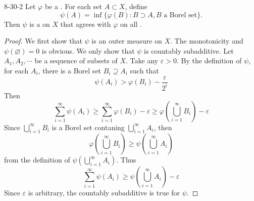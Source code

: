 \documentclass[../main.tex]{subfiles}
\begin{document}
\begin{theorem}{}{8-30-2}
Let $\varphi$ be a . For each set $A \subset X$, define
\[
\psi(A) = \inf\{\varphi(B) : B \supset A, B \text{ a Borel set}\}.
\]
Then $\psi$ is a  on $X$ that agrees with $\varphi$ on all .
\end{theorem}
\begin{proof}
    We first show that \(  \psi   \) is an outer measure on \(  X  \). The monotonicity and \(  \psi \left( \varnothing \right)= 0   \) is obvious. We only show that \(  \psi   \) is countably subadditive. Let \(  A_1,A_2,\cdots   \) be a sequence of subsets of \(  X  \). Take any \(   \varepsilon > 0  \).  By the definition of \(  \psi   \), for each \(  A_{i}  \), there is a Borel set \(  B_{i} \supseteq A_{i} \) such that \[
    \psi \left( A_{i} \right) >  \varphi \left( B_{i} \right)-\frac{ \varepsilon  }{2^{i} }  
    \]  Then \[
    \sum _{i= 1}^{\infty}\psi \left( A_{i} \right)\ge \sum _{i= 1}^{\infty} \varphi \left( B_{i} \right)- \varepsilon \ge    \varphi \left( \bigcup _{i= 1}^{\infty}B_{i} \right)- \varepsilon  
    \]Since \(  \bigcup _{i= 1}^{\infty}B_{i}  \) is a Borel set contaning \(  \bigcup _{i= 1}^{\infty}A_{i}  \), then  \[
     \varphi \left( \bigcup _{i= 1}^{\infty}B_{i} \right)\ge \psi \left( \bigcup _{i= 1}^{\infty}A_{i} \right)  
    \] from the definition of \(  \psi \left( \bigcup _{i= 1}^{\infty}A_{i} \right)   \). Thus \[
    \sum _{i= 1}^{\infty}\psi \left( A_{i} \right)\ge \psi \left( \bigcup _{i= 1}^{\infty}A_{i} \right)- \varepsilon   
    \]Since \(   \varepsilon   \) is arbitrary, the countably subadditive is true for \(  \psi   \).    
    

\end{proof}
\end{document}
